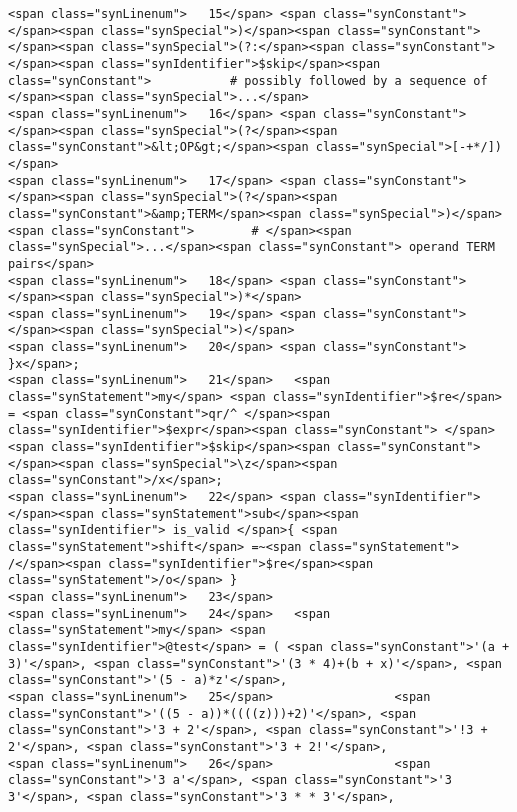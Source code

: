 \begin{verbatim}
<span class="synLinenum">   15</span> <span class="synConstant">                     </span><span class="synSpecial">)</span><span class="synConstant"> </span><span class="synSpecial">(?:</span><span class="synConstant"> </span><span class="synIdentifier">$skip</span><span class="synConstant">           # possibly followed by a sequence of </span><span class="synSpecial">...</span>
<span class="synLinenum">   16</span> <span class="synConstant">                           </span><span class="synSpecial">(?</span><span class="synConstant">&lt;OP&gt;</span><span class="synSpecial">[-+*/])</span>
<span class="synLinenum">   17</span> <span class="synConstant">                           </span><span class="synSpecial">(?</span><span class="synConstant">&amp;TERM</span><span class="synSpecial">)</span><span class="synConstant">        # </span><span class="synSpecial">...</span><span class="synConstant"> operand TERM pairs</span>
<span class="synLinenum">   18</span> <span class="synConstant">                       </span><span class="synSpecial">)*</span>
<span class="synLinenum">   19</span> <span class="synConstant">              </span><span class="synSpecial">)</span>
<span class="synLinenum">   20</span> <span class="synConstant">            }x</span>;
<span class="synLinenum">   21</span>   <span class="synStatement">my</span> <span class="synIdentifier">$re</span> = <span class="synConstant">qr/^ </span><span class="synIdentifier">$expr</span><span class="synConstant"> </span><span class="synIdentifier">$skip</span><span class="synConstant"> </span><span class="synSpecial">\z</span><span class="synConstant">/x</span>;
<span class="synLinenum">   22</span> <span class="synIdentifier">  </span><span class="synStatement">sub</span><span class="synIdentifier"> is_valid </span>{ <span class="synStatement">shift</span> =~<span class="synStatement"> /</span><span class="synIdentifier">$re</span><span class="synStatement">/o</span> }
<span class="synLinenum">   23</span> 
<span class="synLinenum">   24</span>   <span class="synStatement">my</span> <span class="synIdentifier">@test</span> = ( <span class="synConstant">'(a + 3)'</span>, <span class="synConstant">'(3 * 4)+(b + x)'</span>, <span class="synConstant">'(5 - a)*z'</span>,
<span class="synLinenum">   25</span>                 <span class="synConstant">'((5 - a))*((((z)))+2)'</span>, <span class="synConstant">'3 + 2'</span>, <span class="synConstant">'!3 + 2'</span>, <span class="synConstant">'3 + 2!'</span>,
<span class="synLinenum">   26</span>                 <span class="synConstant">'3 a'</span>, <span class="synConstant">'3 3'</span>, <span class="synConstant">'3 * * 3'</span>,

\end{verbatim}
